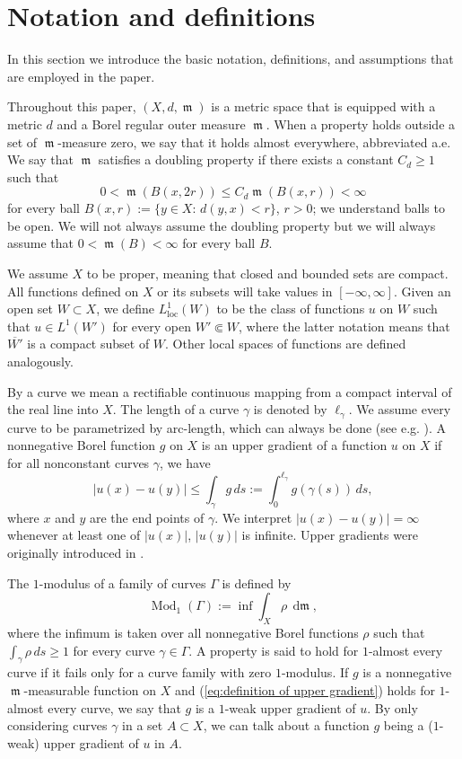 \documentclass[11pt]{article}
\numberwithin{equation}{section}
\theoremstyle{plain}
\theoremstyle{definition}
\numberwithin{equation}{section}
\newcommand{\loc}{\mathrm{loc}}
\DeclareMathOperator{\frm}{\mathfrak{m}}
\DeclareMathOperator{\dfrm}{d\mathfrak{m}}
\DeclareMathOperator{\Mod}{Mod}
\begin{document}
\section{Notation and definitions}\label{sec:preliminaries}

In this section we introduce the basic notation, definitions,
and assumptions that are employed in the paper.

Throughout this paper, $(X,d,\frm)$ is a metric space that is equip\-ped
with a metric $d$ and a Borel regular outer measure $\frm$.
When a property holds outside a set of $\frm$-measure zero, we say that it holds
almost everywhere, abbreviated a.e.
We say that $\frm$ satisfies
a doubling property if
there exists a constant $C_d\ge 1$ such that
\begin{equation}\label{eq:doubling}
0<\frm(B(x,2r))\le C_d\frm(B(x,r))<\infty
\end{equation}
for every ball $B(x,r):=\{y\in X\colon\,d(y,x)<r\}$, $r>0$; we understand balls to be open.
We will not always assume the doubling property but we will always assume that
$0<\frm(B)<\infty$ for every ball $B$.

We assume $X$ to be proper, meaning that closed and bounded sets are compact.
All functions defined on $X$ or its subsets will take values in $[-\infty,\infty]$.
Given an open set $W\subset X$, we define $L^1_{\loc}(W)$
to be the class
of functions $u$ on $W$
such that $u\in L^1(W')$ for every open $W'\Subset W$, where the latter notation means that
$\overline{W'}$ is a compact subset of $W$.
Other local spaces of functions are defined analogously.

By a curve we mean a rectifiable continuous mapping from a compact interval of the real line into $X$.
The length of a curve $\gamma$
is denoted by $\ell_{\gamma}$. We assume every curve to be parametrized
by arc-length, which can always be done (see e.g. \cite[Theorem~3.2]{Hj}).
A nonnegative Borel function $g$ on $X$ is an upper gradient 
of a function $u$
on $X$ if for all nonconstant curves $\gamma$, we have
\begin{equation}\label{eq:definition of upper gradient}
|u(x)-u(y)|\le \int_{\gamma} g\,ds:=\int_0^{\ell_{\gamma}} g(\gamma(s))\,ds,
\end{equation}
where $x$ and $y$ are the end points of $\gamma$.
We interpret $|u(x)-u(y)|=\infty$ whenever  
at least one of $|u(x)|$, $|u(y)|$ is infinite.
Upper gradients were originally introduced in \cite{HK}.

The $1$-modulus of a family of curves $\Gamma$ is defined by
\[
\Mod_{1}(\Gamma):=\inf\int_{X}\rho\, \dfrm,
\]
where the infimum is taken over all nonnegative Borel functions $\rho$
such that $\int_{\gamma}\rho\,ds\ge 1$ for every curve $\gamma\in\Gamma$.
A property is said to hold for $1$-almost every curve
if it fails only for a curve family with zero $1$-modulus. 
If $g$ is a nonnegative $\frm$-measurable function on $X$
and (\ref{eq:definition of upper gradient}) holds for $1$-almost every curve,
we say that $g$ is a $1$-weak upper gradient of $u$. 
By only considering curves $\gamma$ in a set $A\subset X$,
we can talk about a function $g$ being a ($1$-weak) upper gradient of $u$ in $A$.
\end{document}
